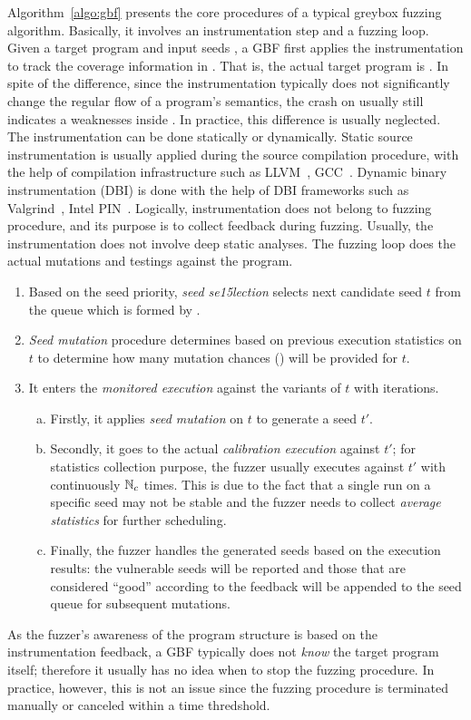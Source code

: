 Algorithm~\ref{algo:gbf} presents the core procedures of a typical greybox fuzzing algorithm. Basically, it involves an instrumentation step and a fuzzing loop. Given a target program \ProgO and input seeds \Seeds, a GBF first applies the instrumentation to track the coverage information in \ProgO. That is, the actual target program is \Prog. In spite of the difference, since the instrumentation typically does not significantly change the regular flow of a program's semantics, the crash on \Prog usually still indicates a weaknesses inside \ProgO. In practice, this difference is usually neglected.
The instrumentation can be done statically or dynamically. Static source instrumentation is usually applied during the source compilation procedure, with the help of compilation infrastructure such as LLVM~\cite{Lattner:2004:LCF:977395.977673}, GCC~\cite{gcc}. Dynamic binary instrumentation (DBI) is done with the help of DBI frameworks such as Valgrind~\cite{valgrind}, Intel PIN~\cite{pin}. Logically, instrumentation does not belong to fuzzing procedure, and its purpose is to collect feedback during fuzzing. Usually, the instrumentation does not involve deep static analyses.
The fuzzing loop does the actual mutations and testings against the program.
\begin{enumerate}[1.]
	\item Based on the seed priority, \emph{seed se15lection} selects next candidate seed $t$ from the queue which is formed by \Seeds.
	\item \emph{Seed mutation} procedure determines based on previous execution statistics on $t$ to determine how many mutation chances (\mutChance) will be provided for $t$.
	\item It enters the \emph{monitored execution} against the variants of $t$ with \mutChance iterations. 
	\begin{enumerate}[a)]
	\item Firstly, it applies \emph{seed mutation} on $t$ to generate a seed $t'$. 
	\item Secondly, it goes to the actual \emph{calibration execution} against $t'$; for statistics collection purpose, the fuzzer usually executes \Prog against $t'$ with continuously $\mathbb{N}_{c}$ times. This is due to the fact that a single run on a specific seed may not be stable and the fuzzer needs to collect \emph{average statistics} for further scheduling.
	\item Finally, the fuzzer handles the generated seeds based on the execution results: the vulnerable seeds will be reported and those that are considered ``good'' according to the feedback will be appended to the seed queue for subsequent mutations.
	\end{enumerate}
\end{enumerate}
As the fuzzer's awareness of the program structure is based on the instrumentation feedback, a GBF typically does not \emph{know} the target program itself; therefore it usually has no idea when to stop the fuzzing procedure. In practice, however, this is not an issue since the fuzzing procedure is terminated manually or canceled within a time thredshold.

